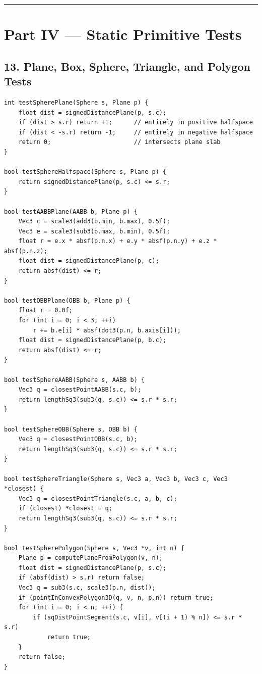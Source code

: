 \documentclass[10pt,letterpaper]{article}
\begin{document}
\medskip\hrule\medskip


\clearpage
{}
\section*{Part IV --- Static Primitive Tests}


\subsection*{13. Plane, Box, Sphere, Triangle, and Polygon Tests}

\begin{verbatim}
int testSpherePlane(Sphere s, Plane p) {
    float dist = signedDistancePlane(p, s.c);
    if (dist > s.r) return +1;      // entirely in positive halfspace
    if (dist < -s.r) return -1;     // entirely in negative halfspace
    return 0;                       // intersects plane slab
}

bool testSphereHalfspace(Sphere s, Plane p) {
    return signedDistancePlane(p, s.c) <= s.r;
}

bool testAABBPlane(AABB b, Plane p) {
    Vec3 c = scale3(add3(b.min, b.max), 0.5f);
    Vec3 e = scale3(sub3(b.max, b.min), 0.5f);
    float r = e.x * absf(p.n.x) + e.y * absf(p.n.y) + e.z * absf(p.n.z);
    float dist = signedDistancePlane(p, c);
    return absf(dist) <= r;
}

bool testOBBPlane(OBB b, Plane p) {
    float r = 0.0f;
    for (int i = 0; i < 3; ++i)
        r += b.e[i] * absf(dot3(p.n, b.axis[i]));
    float dist = signedDistancePlane(p, b.c);
    return absf(dist) <= r;
}

bool testSphereAABB(Sphere s, AABB b) {
    Vec3 q = closestPointAABB(s.c, b);
    return lengthSq3(sub3(q, s.c)) <= s.r * s.r;
}

bool testSphereOBB(Sphere s, OBB b) {
    Vec3 q = closestPointOBB(s.c, b);
    return lengthSq3(sub3(q, s.c)) <= s.r * s.r;
}

bool testSphereTriangle(Sphere s, Vec3 a, Vec3 b, Vec3 c, Vec3 *closest) {
    Vec3 q = closestPointTriangle(s.c, a, b, c);
    if (closest) *closest = q;
    return lengthSq3(sub3(q, s.c)) <= s.r * s.r;
}

bool testSpherePolygon(Sphere s, Vec3 *v, int n) {
    Plane p = computePlaneFromPolygon(v, n);
    float dist = signedDistancePlane(p, s.c);
    if (absf(dist) > s.r) return false;
    Vec3 q = sub3(s.c, scale3(p.n, dist));
    if (pointInConvexPolygon3D(q, v, n, p.n)) return true;
    for (int i = 0; i < n; ++i) {
        if (sqDistPointSegment(s.c, v[i], v[(i + 1) % n]) <= s.r * s.r)
            return true;
    }
    return false;
}
\end{verbatim}
\end{document}
